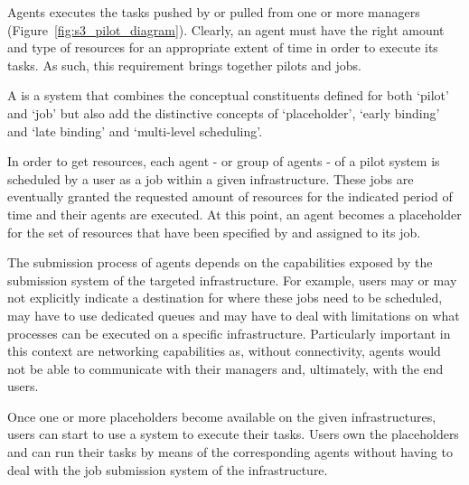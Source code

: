 \documentclass{sig-alternate}
\begin{document}

Agents executes the tasks pushed by or pulled from one or more managers (Figure~\ref{fig:s3_pilot_diagram}). Clearly, an agent must have the right amount and type of resources for an appropriate extent of time in order to execute its tasks. As such, this requirement brings together pilots and jobs.


A \pilotjob is a system that combines the conceptual constituents defined for both `pilot' and `job' but also add the distinctive concepts of `placeholder', `early binding' and `late binding' and `multi-level scheduling'. 


In order to get resources, each agent - or group of agents - of a pilot system is scheduled by a user as a job within a given infrastructure. These jobs are eventually granted the requested amount of resources for the indicated period of time and their agents are executed. At this point, an agent becomes a placeholder for the set of resources that have been specified by and assigned to its job.


The submission process of agents depends on the capabilities exposed by the submission system of the targeted infrastructure. For example, users may or may not explicitly indicate a destination for where these jobs need to be scheduled, may have to use dedicated queues and may have to deal with limitations on what processes can be executed on a specific infrastructure. Particularly important in this context are networking capabilities as, without connectivity, agents would not be able to communicate with their managers and, ultimately, with the end users.

Once one or more placeholders become available on the given infrastructures, users can start to use a \pilotjob system to execute their tasks. Users own the placeholders and can run their tasks by means of the corresponding agents without having to deal with the job submission system of the infrastructure. 
\end{document}
